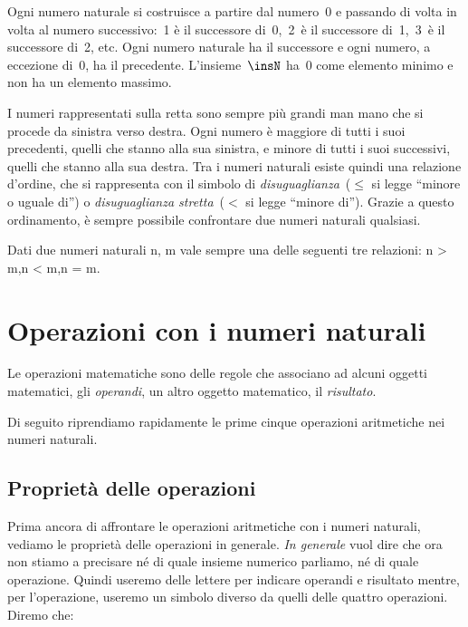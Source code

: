 \begin{inaccessibleblock}
\begin{center}
 
\end{center}
\end{inaccessibleblock}

Ogni numero naturale si costruisce a partire dal numero~0 e passando di 
volta in volta al numero successivo:~1 è il successore di~0,~2~è il 
successore di~1,~3~è il successore di~2, etc. 
Ogni numero naturale ha il successore e ogni numero, a eccezione di~0, ha il
precedente. 
L'insieme~$\insN$ ha~0 come elemento minimo e non ha un elemento massimo.

I numeri rappresentati sulla retta sono sempre più grandi man mano che si 
procede da sinistra verso destra. 
Ogni numero è maggiore di tutti i suoi precedenti, quelli che stanno alla 
sua sinistra, e minore di tutti i suoi successivi, quelli che stanno alla 
sua destra. 
Tra i numeri naturali esiste quindi una relazione d'ordine, che si 
rappresenta con il simbolo di 
\emph{disuguaglianza}~($\le$ si legge ``minore o uguale di'') o 
\emph{disuguaglianza stretta}~($<$ si legge ``minore di'').
Grazie a questo ordinamento, è sempre possibile confrontare due numeri 
naturali qualsiasi.

\begin{legge}[di tricotomia]
Dati due numeri naturali n, m vale sempre una delle seguenti tre relazioni: 
\quad n > m,\quad n < m,\quad n = m.
\end{legge}

\section{Operazioni con i numeri naturali}
\label{sec:01_operazioni}

Le operazioni matematiche sono delle regole che associano ad
alcuni oggetti matematici, gli \emph{operandi}, un altro oggetto 
matematico, il \emph{risultato}.

Di seguito riprendiamo rapidamente le prime cinque operazioni aritmetiche 
nei numeri naturali. 

\subsection{Proprietà delle operazioni}

Prima ancora di affrontare le operazioni aritmetiche con i numeri naturali, 
vediamo le proprietà delle operazioni in generale. \emph{In generale} vuol 
dire che ora non stiamo a precisare né di quale insieme numerico parliamo, 
né di quale operazione. Quindi useremo delle lettere per indicare  
operandi e  risultato mentre, per l'operazione, useremo un simbolo diverso 
da quelli delle quattro operazioni. Diremo che:


